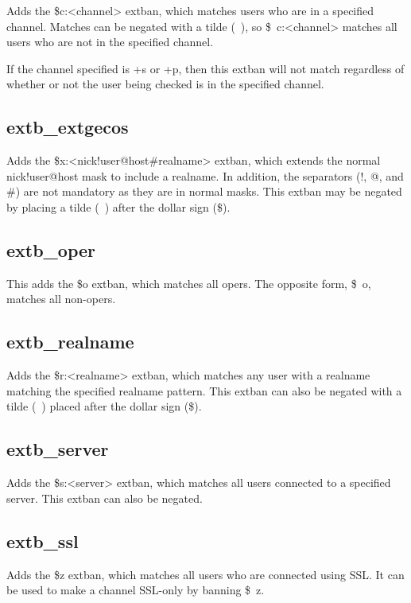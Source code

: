 	Adds the \$c:<channel> extban, which matches users who are in
	a specified channel.  Matches can be negated with a tilde (~), so
	\$~c:<channel> matches all users who are not in the specified channel.

	If the channel specified is +s or +p, then this extban will not match
	regardless of whether or not the user being checked is in the specified
	channel.

\subsection{extb\_extgecos}

	Adds the \$x:<nick!user@host\#realname> extban, which extends the normal
	nick!user@host mask to include a realname.  In addition, the separators
	(!, @, and \#) are not mandatory as they are in normal masks.  This extban
	may be negated by placing a tilde (~) after the dollar sign (\$).

\subsection{extb\_oper}

	This adds the \$o extban, which matches all opers.  The opposite form,
	\$~o, matches all non-opers.

\subsection{extb\_realname}

	Adds the \$r:<realname> extban, which matches any user with a realname
	matching the specified realname pattern.  This extban can also be negated
	with a tilde (~) placed after the dollar sign (\$).

\subsection{extb\_server}

	Adds the \$s:<server> extban, which matches all users connected to a
	specified server.  This extban can also be negated.

\subsection{extb\_ssl}

	Adds the \$z extban, which matches all users who are connected using SSL.
	It can be used to make a channel SSL-only by banning \$~z.


